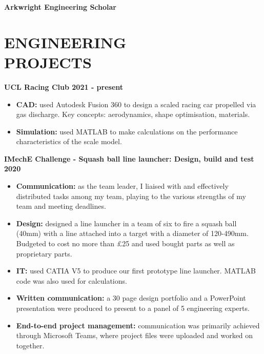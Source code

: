 \documentclass[margin, 10pt]{res} %
\begin{document}
\begin{resume}
\textbf{Arkwright Engineering Scholar}


\section{ENGINEERING \\ PROJECTS}

\textbf{UCL Racing Club \hfill 2021 - present}
\\
\begin{itemize}
  \item \textbf{CAD:} used Autodesk Fusion 360 to design a scaled racing car propelled via gas discharge. Key concepts: aerodynamics, shape optimisation, materials.
  \item \textbf{Simulation:} used MATLAB to make calculations on the performance characteristics of the scale model.
\end{itemize}

\textbf{IMechE Challenge - Squash ball line launcher: Design, build and test \hfill 2020}
\\
\begin{itemize}
  \item \textbf{Communication:} as the team leader, I liaised with and effectively distributed tasks among my team, playing to the various strengths of my team and meeting deadlines.
  \item \textbf{Design:} designed a line launcher in a team of six to fire a squash ball (40\si{\milli\meter}) with a line attached into a target with a diameter of 120-490\si{\milli\meter}. Budgeted to cost no more than £25 and used bought parts as well as proprietary parts.
  \item \textbf{IT:} used CATIA V5 to produce our first prototype line launcher. MATLAB code was also used for calculations. 
  \item \textbf{Written communication:} a 30 page design portfolio and a PowerPoint presentation were produced to present to a panel of 5 engineering experts. 
  \item \textbf{End-to-end project management:} communication was primarily achieved through Microsoft Teams, where project files were uploaded and worked on together. 
\end{itemize}
 

\end{resume}
\end{document}
